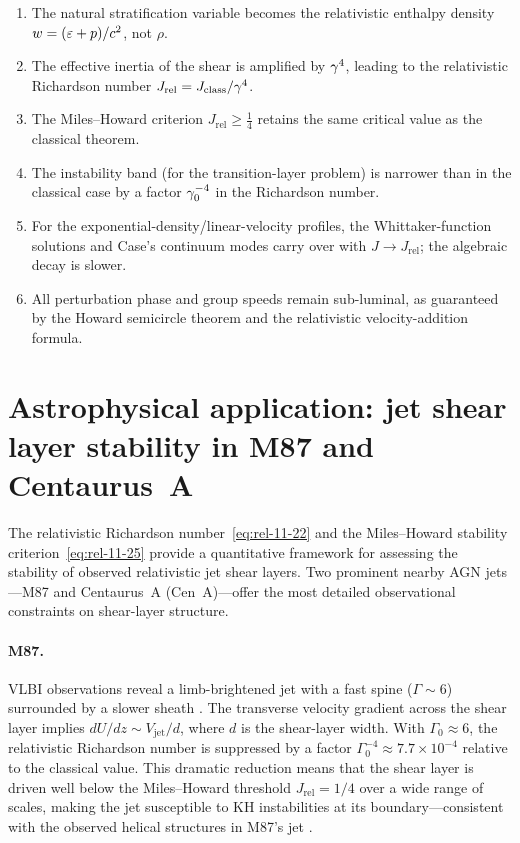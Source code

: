 \begin{enumerate}
\item The natural stratification variable becomes the relativistic
  enthalpy density $w=(\varepsilon+p)/c^{2}$, not $\rho$.
\item The effective inertia of the shear is amplified by $\gamma^{4}$,
  leading to the relativistic Richardson number
  $J_{\mathrm{rel}}=J_{\mathrm{class}}/\gamma^{4}$.
\item The Miles--Howard criterion $J_{\mathrm{rel}}\geqslant\frac{1}{4}$
  retains the same critical value as the classical theorem.
\item The instability band (for the transition-layer problem) is
  narrower than in the classical case by a factor $\gamma_{0}^{-4}$ in
  the Richardson number.
\item For the exponential-density/linear-velocity profiles, the
  Whittaker-function solutions and Case's continuum modes carry over
  with $J\to J_{\mathrm{rel}}$; the algebraic decay is slower.
\item All perturbation phase and group speeds remain sub-luminal,
  as guaranteed by the Howard semicircle theorem and the relativistic
  velocity-addition formula.
\end{enumerate}

\section*{Astrophysical application: jet shear layer stability in M87 and Centaurus~A}
\label{sec:rel-102-103-app}

The relativistic Richardson number~\eqref{eq:rel-11-22} and the
Miles--Howard stability criterion~\eqref{eq:rel-11-25} provide
a quantitative framework for assessing the stability of observed
relativistic jet shear layers.  Two prominent nearby AGN jets---M87
and Centaurus~A (Cen~A)---offer the most detailed observational
constraints on shear-layer structure.

\paragraph{M87.}
VLBI observations reveal a limb-brightened jet with a fast spine
($\Gamma \sim 6$) surrounded by a slower sheath
\cite{LobanovZensus2001, WalkerEtAl2018}.
The transverse velocity gradient across the shear layer implies
$dU/dz \sim V_{\mathrm{jet}}/d$, where $d$ is the shear-layer width.
With $\Gamma_0 \approx 6$, the relativistic Richardson number is
suppressed by a factor $\Gamma_0^{-4} \approx 7.7 \times 10^{-4}$
relative to the classical value.  This dramatic reduction means that the
shear layer is driven well below the Miles--Howard threshold $J_{\mathrm{rel}} = 1/4$
over a wide range of scales, making the jet susceptible to KH
instabilities at its boundary---consistent with the observed helical
structures in M87's jet \cite{HardeeEtAl2007}.

